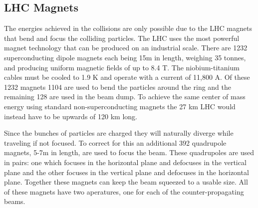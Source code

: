 \subsection{LHC Magnets}
The energies achieved in the collisions are only possible due to the LHC magnets that bend and focus the colliding particles.  The LHC uses the most powerful magnet technology that can be produced on an industrial scale.  There are 1232 superconducting dipole magnets each being 15m in length, weighing 35 tonnes, and producing uniform magnetic fields of up to 8.4 T.  The niobium-titanium cables must be cooled to 1.9 K and operate with a current of 11,800 A.  Of these 1232 magnets 1104 are used to bend the particles around the ring and the remaining 128 are used in the beam dump.  To achieve the same center of mass energy using standard non-superconducting magnets the 27 km LHC would instead have to be upwards of 120 km long.

Since the bunches of particles are charged they will naturally diverge while traveling if not focused.  To correct for this an additional 392 quadrupole magnets, 5-7m in length, are used to focus the beam.  These quadrupoles are used in pairs: one which focuses in the horizontal plane and defocuses in the vertical plane and the other focuses in the vertical plane and defocuses in the horizontal plane.  Together these magnets can keep the beam squeezed to a usable size.  All of these magnets have two aperatures, one for each of the counter-propagating beams.

